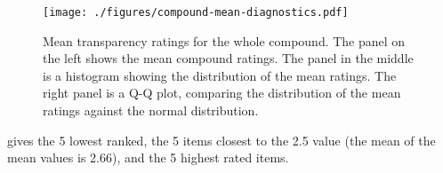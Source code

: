 \begin{figure}[!htb]
  \centering

\texttt{[image: ./figures/compound-mean-diagnostics.pdf]}
  
  \caption{Mean transparency ratings for the whole compound. The panel on
    the left shows the mean compound ratings. The panel in the middle is a
    histogram showing the distribution of the mean ratings. The right
    panel is a Q-Q plot, comparing the distribution of the mean
    ratings against the normal distribution.}
  \label{fig:reddy-means-whole-compound}
\end{figure}



 gives the 5 lowest ranked, the 5 items
closest to the 2.5 value (the mean of the mean values is 2.66), and the 5 highest
rated items. 

